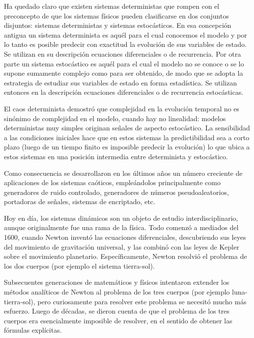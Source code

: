 Ha quedado claro que existen sistemas deterministas que rompen con el preconcepto de que los sistemas físicos pueden clasificarse en dos conjuntos disjuntos: sistemas deterministas y sistemas estocásticos.
En esa concepción antigua un sistema determinista es aquél para el cual conocemos el modelo y por lo tanto es posible predecir con exactitud la evolución de sus variables de estado.
Se utilizan en su descripción ecuaciones diferenciales o de recurrencia.
Por otra parte un sistema estocástico es aquél para el cual el modelo no se conoce o se lo supone sumamente complejo como para ser obtenido, de modo que se adopta la estrategia de estudiar sus variables de estado en forma estadística.
Se utilizan entonces en la descripción ecuaciones diferenciales o de recurrencia estocásticas.

El caos determinista demostró que complejidad en la evolución temporal no es sinónimo de complejidad en el modelo, cuando hay no linealidad: modelos deterministas muy simples originan señales de aspecto estocástico.
La sensibilidad a las condiciones iniciales hace que en estos sistemas la predictibilidad sea a corto plazo (luego de un tiempo finito es imposible predecir la evolución) lo que ubica a estos sistemas en una posición intermedia entre determinista y estocástico.

Como consecuencia se desarrollaron en los últimos años un número creciente de aplicaciones de los sistemas caóticos, empleándolos principalmente como generadores de ruido controlado, generadores de números pseudoaleatorios, portadoras de señales, sistemas de encriptado, etc.

Hoy en día, los sistemas dinámicos son un objeto de estudio interdisciplinario, aunque originalmente fue una rama de la física.
Todo comenzó a mediados del 1600, cuando Newton inventó las ecuaciones diferenciales, descubriendo sus leyes del movimiento de gravitación universal, y las combinó con las leyes de Kepler sobre el movimiento planetario.
Específicamente, Newton resolvió el problema de los dos cuerpos (por ejemplo el sistema tierra-sol).

Subsecuentes generaciones de matemáticos y físicos intentaron extender los métodos analíticos de Newton al problema de los tres cuerpos (por ejemplo luna-tierra-sol), pero curiosamente para resolver este problema se necesitó mucho más esfuerzo.
Luego de décadas, se dieron cuenta de que el problema de los tres cuerpos era esencialmente imposible de resolver, en el sentido de obtener las fórmulas explícitas.


